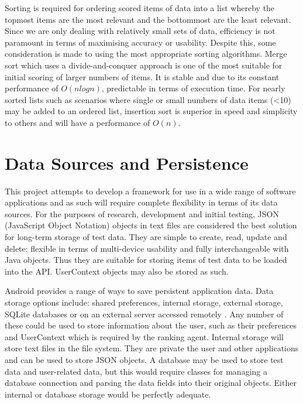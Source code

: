 Sorting is required for ordering scored items of data into a list whereby the topmost items are the most relevant and the bottommost are the least relevant. Since we are only dealing with relatively small sets of data, efficiency is not paramount in terms of maximising accuracy or usability. Despite this, some consideration is made to using the most appropriate sorting algorithms. 
Merge sort which uses a divide-and-conquer approach is one of the most suitable for initial scoring of larger numbers of items. It is stable and due to its constant performance of $O(nlogn)$, predictable in terms of execution time. 
For nearly sorted lists such as scenarios where single or small numbers of data items (<10) may be added to an ordered list, insertion sort is superior in speed and simplicity to others and will have a performance of $O(n)$.

\section{Data Sources and Persistence}

This project attempts to develop a framework for use in a wide range of software applications and as such will require complete flexibility in terms of its data sources. For the purposes of research, development and initial testing, JSON (JavaScript Object Notation) objects in text files are considered the best solution for long-term storage of test data. They are simple to create, read, update and delete; flexible in terms of multi-device usability and fully interchangeable with Java objects. Thus they are suitable for storing items of test data to be loaded into the API. UserContext objects may also be stored as such.

Android provides a range of ways to save persistent application data. Data storage options include: shared preferences, internal storage, external storage, SQLite databases or on an external server accessed remotely \cite{BeginningAndroidDataPersistence}. Any number of these could be used to store information about the user, such as their preferences and UserContext which is required by the ranking agent. 
Internal storage will store text files in the file system. They are private the user and other applications and can be used to store JSON objects. A database may be used to store test data and user-related data, but this would require classes for managing a database connection and parsing the data fields into their original objects. Either internal or database storage would be perfectly adequate.

